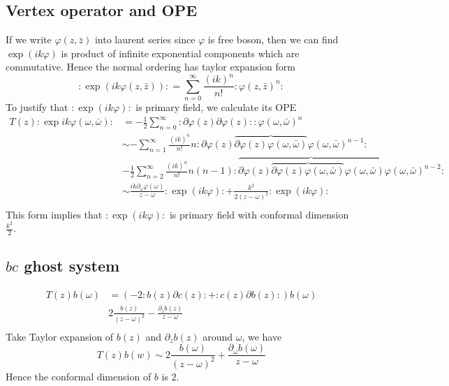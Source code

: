 \documentclass[11pt,a4paper]{article}
\theoremstyle{definition}
\begin{document}
\subsection{Vertex operator and OPE}
If we write $\varphi(z,\bar{z})$ into laurent series since $\varphi$ is free boson, then we can find $\exp(ik \varphi)$ is product of infinite exponential components which are commutative. Hence the normal ordering has taylor expansion form
\[
:\exp(ik \varphi(z,\bar{z})): = \sum_{n=0}^{\infty} \frac{(ik)^n}{n!}: \varphi(z,\bar{z})^n:
\]
To justify that $:\exp(ik \varphi):$ is primary field, we calculate its OPE
\[
\begin{aligned}
T(z):\exp{ik \varphi(\omega,\bar{\omega})}:& = - \frac{1}{2} \sum_{n=0}^{\infty} : \partial \varphi(z) \partial \varphi(z) :: \varphi(\omega, \bar{\omega})^n\\
&\sim - \sum_{n=1}^{\infty} \frac{(ik)^n}{n!} n : \partial \varphi(z) \overbrace{\partial \varphi(z) \varphi(\omega,\bar{\omega})} \varphi(\omega,\bar{\omega})^{n-1}:\\
&- \frac{1}{2}\sum_{n=2}^{\infty} \frac{(ik)^n}{n!} n(n-1) : \overbrace{\partial \varphi(z) \overbrace{\partial \varphi(z) \varphi(\omega, \bar{\omega})} \varphi(\omega,\bar{\omega})} \varphi(\omega,\bar{\omega})^{n-2}:\\
&\sim \frac{ik \partial_\omega \varphi(\omega)}{z-\omega}:\exp(ik\varphi): +\frac{k^2}{2(z-\omega)^2} :\exp(ik\varphi):\\
\end{aligned}
\]
This form implies that $:\exp(ik\varphi):$ is primary field with conformal dimension $\frac{k^2}{2}$.
\subsection{$bc$ ghost system}
 \[
 \begin{aligned}
 T(z) b(\omega) & = (-2: b(z) \partial c(z): + :c(z) \partial b(z):) b(\omega)\\
 & 2 \frac{b(z)}{(z-\omega)^2} - \frac{\partial_z b(z)}{z-\omega}\\
 \end{aligned}
 \]
 Take Taylor expansion of $b(z)$ and $\partial_z b(z)$ around $\omega$, we have
 \[
 T(z)b(w) \sim 2\frac{b(\omega)}{(z-\omega)^2} + \frac{\partial_\omega b(\omega)}{z-\omega}
 \]
 Hence the conformal dimension of $b$ is $2$.
 
\end{document}
